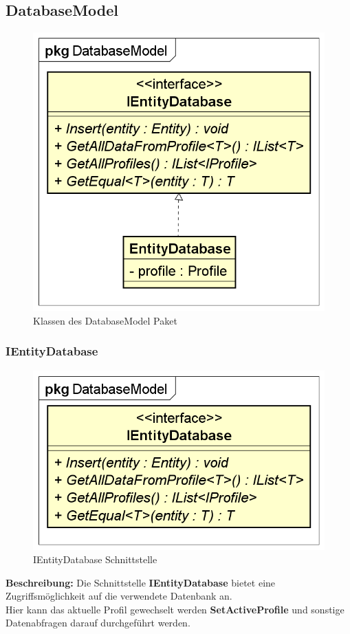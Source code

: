 \documentclass[a4paper]{scrreprt}
\begin{document}
\subsection{DatabaseModel}
\begin{figure}[H]
\centering
\includegraphics[width=0.55\textheight]{graphics/Klassendiagramme/Model/DatabaseModelPackage.png}
\caption{Klassen des DatabaseModel Paket}
\end{figure}

\subsubsection{IEntityDatabase}
\begin{figure}[H]
\centering
\includegraphics[width=0.45\textheight]{graphics/Klassendiagramme/Model/IEntityDatabase.png}
\caption{IEntityDatabase Schnittstelle}
\end{figure}
\textbf{Beschreibung:} Die Schnittstelle \textbf{IEntityDatabase} bietet eine Zugriffsmöglichkeit auf die verwendete Datenbank an.\\
Hier kann das aktuelle Profil gewechselt werden \textbf{SetActiveProfile} und sonstige Datenabfragen darauf durchgeführt werden.
\end{document}
